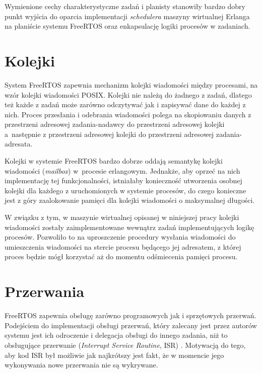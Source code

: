 Wymienione cechy charakterystyczne zadań i planisty stanowiły bardzo dobry punkt wyjścia do oparcia implementacji \emph{schedulera} maszyny wirtualnej Erlanga na planiście systemu FreeRTOS oraz enkapsulację logiki procesów w zadaniach.

\section{Kolejki}
\label{sec:rtosKolejki}

System FreeRTOS zapewnia mechanizm kolejki wiadomości między procesami, na wzór kolejki wiadomości POSIX. Kolejki nie należą do żadnego z zadań, dlatego też każde z zadań może zarówno odczytywać jak i zapisywać dane do każdej z nich. Proces przesłania i odebrania wiadomości polega na skopiowaniu danych z przestrzeni adresowej zadania-nadawcy do przestrzeni adresowej kolejki a~następnie z przestrzeni adresowej kolejki do przestrzeni adresowej zadania-adresata.

Kolejki w systemie FreeRTOS bardzo dobrze oddają semantykę kolejki wiadomości (\emph{mailbox}) w~procesie erlangowym. Jednakże, aby oprzeć na nich implementację tej funkcjonalności, istniałaby konieczność utworzenia osobnej kolejki dla każdego z uruchomionych w systemie procesów, do czego konieczne jest z góry zaalokowanie pamięci dla kolejki wiadomości o maksymalnej długości.

W związku z tym, w maszynie wirtualnej opisanej w niniejszej pracy kolejki wiadomości zostały zaimplementowane wewnątrz zadań implementujących logikę procesów. Pozwoliło to na uproszczenie procedury wysłania wiadomości do umieszczenia wiadomości na stercie procesu będącego jej adresatem, z której proces będzie mógł korzystać aż do momentu odśmiecenia pamięci procesu. 

\section{Przerwania}
\label{sec:rtosPrzerwania}

FreeRTOS zapewnia obsługę zarówno programowych jak i sprzętowych przerwań. Podejściem do implementacji obsługi przerwań, który zalecany jest przez autorów systemu jest ich odroczenie i delegacja obsługi do innego zadania, niż to obsługujące przerwanie (\emph{Interrupt Service Routine}, ISR) \cite{Barry2011}. Motywacją do tego, aby kod ISR był możliwie jak najkrótszy jest fakt, że w momencie jego wykonywania nowe przerwania nie są wykrywane.

